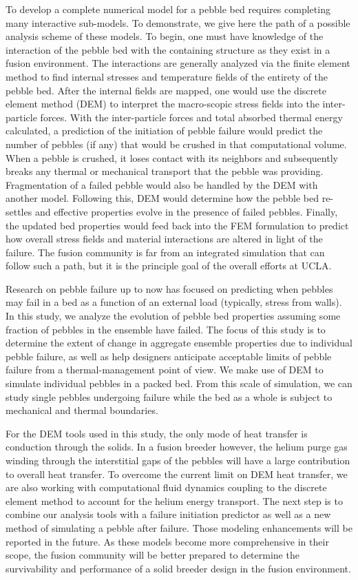 To develop a complete numerical model for a pebble bed requires completing many interactive sub-models. To demonstrate, we give here the path of a possible analysis scheme of these models. To begin, one must have knowledge of the interaction of the pebble bed with the containing structure as they exist in a fusion environment. The interactions are generally analyzed via the finite element method to find internal stresses and temperature fields of the entirety of the pebble bed. After the internal fields are mapped, one would use the discrete element method (DEM) to interpret the macro-scopic stress fields into the inter-particle forces. With the inter-particle forces and total absorbed thermal energy calculated, a prediction of the initiation of pebble failure would predict the number of pebbles (if any) that would be crushed in that computational volume. When a pebble is crushed, it loses contact with its neighbors and subsequently breaks any thermal or mechanical transport that the pebble was providing. Fragmentation of a failed pebble would also be handled by the DEM with another model. Following this, DEM would determine how the pebble bed re-settles and effective properties evolve in the presence of failed pebbles.  Finally, the updated bed properties would feed back into the FEM formulation to predict how overall stress fields and material interactions are altered in light of the failure. The fusion community is far from an integrated simulation that can follow such a path, but it is the principle goal of the overall efforts at UCLA.

Research on pebble failure up to now has focused on predicting when pebbles may fail in a bed as a function of an external load (typically, stress from walls). In this study, we analyze the evolution of pebble bed properties assuming some fraction of pebbles in the ensemble have failed. The focus of this study is to determine the extent of change in aggregate ensemble properties due to individual pebble failure, as well as help designers anticipate acceptable limits of pebble failure from a thermal-management point of view. We make use of DEM to simulate individual pebbles in a packed bed. From this scale of simulation, we can study single pebbles undergoing failure while the bed as a whole is subject to mechanical and thermal boundaries.

For the DEM tools used in this study, the only mode of heat transfer is conduction through the solids. In a fusion breeder however, the helium purge gas winding through the interstitial gaps of the pebbles will have a large contribution to overall heat transfer\cite{Reimann:2002mi,Abou-Sena2005}. To overcome the current limit on DEM heat transfer, we are also working with computational fluid dynamics coupling to the discrete element method to account for the helium energy transport. The next step is to combine our analysis tools with a failure initiation predictor as well as a new method of simulating a pebble after failure. Those modeling enhancements will be reported in the future. As these models become more comprehensive in their scope, the fusion community will be better prepared to determine the survivability and performance of a solid breeder design in the fusion environment.


